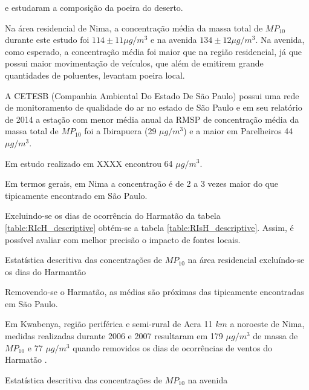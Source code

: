\cite{engelbrecht2009a} e \citep{engelbrecht2009b} estudaram a composição 
da poeira do deserto.





Na área residencial de Nima, a concentração média da massa total de $MP_{10}$ 
durante este estudo foi $114\pm 11 \mu g / m^3$ e na avenida 
$134\pm 12 \mu g / m^3$. Na avenida, como esperado, a concentração média 
foi maior que na região residencial, já que possui maior movimentação de 
veículos, que além de emitirem grande quantidades de poluentes, levantam 
poeira local. 

A CETESB (Companhia Ambiental Do Estado De São Paulo) possui uma rede de 
monitoramento de qualidade do ar no estado de São Paulo e em seu relatório 
de 2014 \citep{cetesb2014} a estação com menor média anual da RMSP 
de concentração média da massa total de $MP_{10}$ foi a Ibirapuera 
(29 $\mu g / m^3$) e a maior em Parelheiros 44 $\mu g / m^3$.  

Em estudo realizado em XXXX \cite{souza2014} encontrou 64 $\mu g / m^3$.

Em termos gerais, em Nima a concentração é de 2 a 3 vezes maior do que 
tipicamente encontrado em São Paulo. 

Excluindo-se os dias de ocorrência do Harmatão da tabela 
\ref{table:RIcH_descriptive} obtém-se a tabela \ref{table:RIsH_descriptive}.
Assim, é possível avaliar com melhor precisão o impacto de fontes locais.  

\begin{table}[H]
  \centering
    
  \caption{Estatística descritiva das concentrações de  $MP_{10}$ na área 
           residencial excluíndo-se os dias do Harmantão
            \label{table:RIsH_descriptive}}
\end{table}

Removendo-se o Harmatão, as médias são próximas das tipicamente
encontradas em São Paulo. 

Em Kwabenya, região periférica e semi-rural de Acra 11 $km$ a noroeste de Nima, 
medidas realizadas durante 2006 e 2007 resultaram em 179 $\mu g / m^3$ de massa 
de $MP_{10}$ e 77 $\mu g / m^3$ quando removidos os dias de ocorrências
de ventos do Harmatão \citep{aboh2009}.

\begin{table}[H]
  \centering
    
  \caption{Estatística descritiva das concentrações de $MP_{10}$ na 
           avenida \label{table:TIcH_descriptive}}
\end{table}

